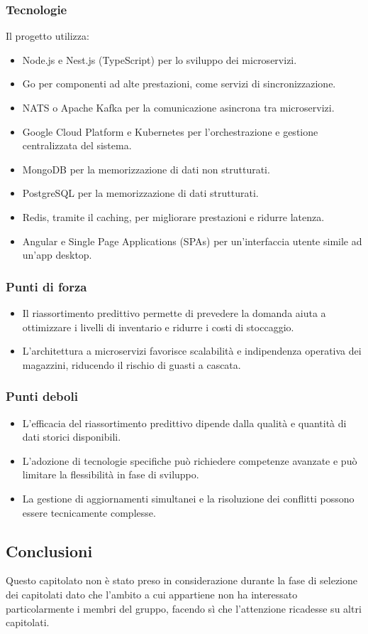     \subsubsection{Tecnologie}
    Il progetto utilizza:

\begin{itemize}
    \item Node.js e Nest.js (TypeScript) per lo sviluppo dei microservizi.
    \item Go per componenti ad alte prestazioni, come servizi di sincronizzazione.
    \item NATS o Apache Kafka per la comunicazione asincrona tra microservizi.
    \item Google Cloud Platform e Kubernetes per l’orchestrazione e gestione centralizzata del sistema.
    \item MongoDB per la memorizzazione di dati non strutturati.
    \item PostgreSQL per la memorizzazione di dati strutturati.
    \item Redis, tramite il caching, per migliorare prestazioni e ridurre latenza.
    \item Angular e Single Page Applications (SPAs) per un’interfaccia utente simile ad un’app desktop.
\end{itemize}
    \subsubsection{Punti di forza}
   \begin{itemize}
    \item Il riassortimento predittivo permette di prevedere la domanda aiuta a ottimizzare i livelli di inventario e ridurre i costi di stoccaggio.
    \item L’architettura a microservizi favorisce scalabilità e indipendenza operativa dei magazzini, riducendo il rischio di guasti a cascata.
\end{itemize}
    \subsubsection{Punti deboli}
    \begin{itemize}
    \item L’efficacia del riassortimento predittivo dipende dalla qualità e quantità di dati storici disponibili.
    \item L’adozione di tecnologie specifiche può richiedere competenze avanzate e può limitare la flessibilità in fase di sviluppo.
    \item La gestione di aggiornamenti simultanei e la risoluzione dei conflitti possono essere tecnicamente complesse.
\end{itemize}
    \subsection{Conclusioni}
    Questo capitolato non è stato preso in considerazione durante la fase di selezione dei capitolati dato che l’ambito a cui appartiene non ha interessato particolarmente i membri del gruppo, facendo sì che l’attenzione ricadesse su altri capitolati.
